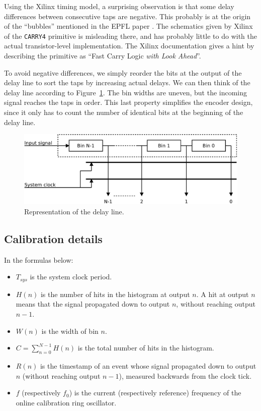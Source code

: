 \documentclass[a4paper,11pt]{article}
\begin{document}
Using the Xilinx timing model, a surprising observation is that some delay differences between consecutive taps are negative. This probably is at the origin of the ``bubbles'' mentioned in the EPFL paper \cite{epfl}. The schematics given by Xilinx of the \verb!CARRY4! primitive is misleading there, and has probably little to do with the actual transistor-level implementation. The Xilinx documentation \cite{s6hdl} gives a hint by describing the primitive as ``Fast Carry Logic \textit{with Look Ahead}''.

To avoid negative differences, we simply reorder the bits at the output of the delay line to sort the taps by increasing actual delays. We can then think of the delay line according to Figure~\ref{fig:delaystruct}. The bin widths are uneven, but the incoming signal reaches the taps in order. This last property simplifies the encoder design, since it only has to count the number of identical bits at the beginning of the delay line.

\begin{figure}[h]
\includegraphics[width=\textwidth]{delaystruct.pdf}
\caption{Representation of the delay line.}
\label{fig:delaystruct}
\end{figure}

\subsection{Calibration details}
In the formulas below:
\begin{itemize}
\item $T_{sys}$ is the system clock period.
\item $H(n)$ is the number of hits in the histogram at output $n$. A hit at output $n$ means that the signal propagated down to output $n$, without reaching output $n-1$.
\item $W(n)$ is the width of bin $n$.
\item $C = \displaystyle\sum\limits_{n=0}^{N-1} H(n)$ is the total number of hits in the histogram.
\item $R(n)$ is the timestamp of an event whose signal propagated down to output $n$ (without reaching output $n-1$), measured backwards from the clock tick.
\item $f$ (respectively $f_{0}$) is the current (respectively reference) frequency of the online calibration ring oscillator.
\end{itemize}
\end{document}
